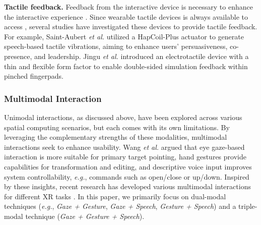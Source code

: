 \documentclass[review]{fcs}
\newcommand{\revise}[2]{\textcolor[rgb]{0,0,0}{#2}}
\begin{document}
\textbf{Tactile feedback.} %
Feedback from the interactive device is necessary to enhance the interactive experience \cite{DBLP:conf/ismar/LiLMHLS22}. Since wearable tactile devices is always available to access \cite{DBLP:conf/ismar/DasNH23}, several studies have investigated these devices to provide tactile feedback. 
\revise{For example, Saint-Aubert \textit{et al.} utilized a HapCoil-Plus actuator to generate speech-based tactile vibrations, aiming to enhance users' persuasiveness, co-presence, and leadership \cite{DBLP:conf/vr/SaintAubertAMPAL23}. Jingu \textit{et al.} introduced an electrotactile device with a thin and flexible form factor to enable double-sided simulation feedback within pinched fingerpads \cite{DBLP:conf/uist/JinguWS23}.}{For example, Saint-Aubert \textit{et al.} \cite{DBLP:conf/vr/SaintAubertAMPAL23} utilized a HapCoil-Plus actuator to generate speech-based tactile vibrations, aiming to enhance users' persuasiveness, co-presence, and leadership. Jingu \textit{et al.} \cite{DBLP:conf/uist/JinguWS23} introduced an electrotactile device with a thin and flexible form factor to enable double-sided simulation feedback within pinched fingerpads.}

\subsubsection{Multimodal Interaction}
\label{MultiInteraction}



Unimodal interactions, as discussed above, have been explored across various spatial computing scenarios, but each comes with its own limitations.
\revise{By leveraging the complementary strengths of these modalities, multimodal interactions seeks to enhance usability. Wang \textit{et al.} argued that eye gaze-based interaction is more suitable for primary target pointing, hand gestures provide capabilities for transformation and editing, and descriptive voice input improves system controllability, \textit{e.g.}, commands such as open/close or up/down \cite{DBLP:journals/thms/WangWYL21}.}{By leveraging the complementary strengths of these modalities, multimodal interactions seek to enhance usability. Wang \textit{et al.} \cite{DBLP:journals/thms/WangWYL21} argued that eye gaze-based interaction is more suitable for primary target pointing, hand gestures provide capabilities for transformation and editing, and descriptive voice input improves system controllability, \textit{e.g.}, commands such as open/close or up/down.} Inspired by these insights, recent research has developed various multimodal interactions for different XR tasks \cite{DBLP:conf/ismar/ChenGFCL23, DBLP:conf/vr/JingLB22}. In this paper, we primarily focus on dual-modal techniques (\textit{e.g.}, \textit{Gaze + Gesture}, \textit{Gaze + Speech}, \textit{Gesture + Speech}) and a triple-modal technique (\textit{Gaze + Gesture + Speech}).
\end{document}
